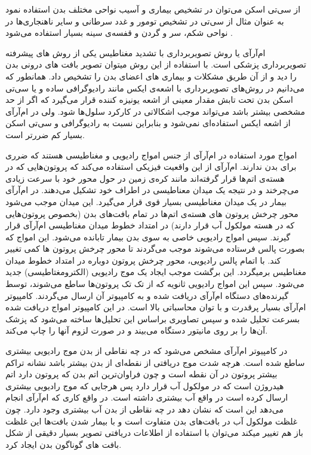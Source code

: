از سی‌تی اسکن می‌توان در تشخیص بیماری و آسیب نواحی مختلف بدن استفاده نمود به عنوان مثال از سی‌تی در تشخیص تومور و غدد سرطانی و سایر ناهنجاری‌ها در نواحی شکم، سر و گردن و قفسه‌ی سینه بسیار استفاده می‌شود .  


ام‌آرآی یا روش تصویربرداری با تشدید مغناطیس یکی از روش های پیشرفته تصویربرداری پزشکی است. با استفاده از این روش میتوان تصویر بافت های درونی بدن را دید و از آن طریق مشکلات و بیماری های اعضای بدن را تشخیص داد.
همانطور که می‌دانیم در روش‌های تصویربرداری با اشعه‌ی ایکس مانند رادیوگرافی ساده و یا سی‌تی اسکن بدن تحت تابش مقدار معینی از اشعه یونیزه کننده قرار می‌گیرد که اگر از حد مشخصی بیشتر باشد می‌تواند موجب اشکالاتی در کارکرد سلول‌ها شود. ولی در ام‌آرآی از اشعه ایکس استفاده‌ای نمی‌شود و بنابراین نسبت به رادیوگرافی و سی‌تی اسکن بسیار کم ضررتر است.

امواج مورد استفاده در ام‌آرآی از جنس امواج رادیویی و مغناطیسی هستند که ضرری برای بدن ندارند. ام‌آرآی از این واقعیت فیزیکی استفاده می‌کند که پروتون‌هایی که در هسته‌ی اتم‌ها قرار گرفته‌اند مانند کره‌ی زمین در حول محور خود با سرعت زیادی می‌چرخند و در نتیجه یک میدان معناطیسی در اطراف خود تشکیل می‌دهند. در ام‌آرآی بیمار در یک میدان مغناطیسی بسیار قوی قرار می‌گیرد. این میدان موجب می‌شود محور چرخش پروتون های هسته‌ی اتم‌ها در تمام بافت‌های بدن (بخصوص پروتون‌هایی که در هسته مولکول آب قرار دارند) در امتداد خطوط میدان مغناطیسی ام‌آرآی قرار گیرند. سپس امواج رادیویی خاصی به سوی بدن بیمار تابانده می‌شود. این امواج که بصورت پالس فرستاده می‌شوند موجب می‌گردند تا محور چرخش پروتون ها کمی تغییر کند. با اتمام پالس رادیویی، محور چرخش پروتون دوباره در امتداد خطوط میدان مغناطیس برمیگردد. این برگشت موجب ایجاد یک موج رادیویی (الکترومغتاطیسی) جدید می‌شود. سپس این امواج رادیویی ثانویه که از تک تک پروتون‌ها ساطع می‌شوند، توسط گیرنده‌های دستگاه ام‌آرآی دریافت شده و به کامپیوتر آن ارسال می‌گردند. کامپیوتر ام‌آرآی بسیار پرقدرت و با توان محاسباتی بالا است. در این کامپیوتر امواج دریافت شده بسرعت تحلیل شده و سپس تصاویری براساس این تحلیل‌ها ساخته می‌شود که پزشک آن‌ها را بر روی مانیتور دستگاه می‌بیند و در صورت لزوم آنها را چاپ می‌کند.

در کامپیوتر ام‌آرآی مشخص می‌شود که در چه نقاطی از بدن موج رادیویی بیشتری ساطع شده است. هرچه شدت موج دریافتی از نقطه‌ای از بدن بیشتر باشد نشانه تراکم بیشتر پروتون در آن نقطه است و چون فراوان‌ترین اتم بدن که پروتون دارد اتم هیدروژن است که در مولکول آب قرار دارد پس هرجایی که موج رادیویی بیشتری ارسال کرده است در واقع آب بیشتری داشته است.
در واقع کاری که ام‌آرآی انجام می‌دهد این است که نشان دهد در چه نقاطی از بدن آب بیشتری وجود دارد. چون غلظت مولکول آب در بافت‌های بدن متفاوت است و با بیمار شدن بافت‌ها این غلظت باز هم تغییر میکند می‌توان با استفاده از اطلاعات دریافتی تصویر بسیار دقیقی از شکل بافت های گوناگون بدن ایجاد کرد.

